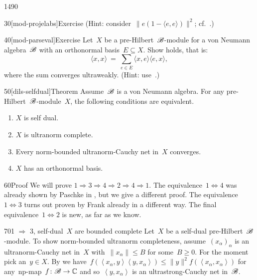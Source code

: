 \begin{parsec}{1490}
\begin{point}{30}[mod-projelabs]{Exercise}
    (Hint: consider~$\| e(1-\langle e, e \rangle) \|^2$;
                 cf.~\cite[thm.~3.12]{paschke}.)
\end{point}
\begin{point}{40}[mod-parseval]{Exercise}
Let~$X$ be a pre-Hilbert~$\mathscr{B}$-module for a von Neumann algebra~$\mathscr{B}$
    with an orthonormal basis~$E \subseteq X$.
    Show  holds, that is:
\begin{equation*}
    \langle x, x \rangle \ =\ 
    \sum_{e \in E} \langle x, e\rangle \langle e, x\rangle,
\end{equation*}
where the sum converges ultraweakly. \cite{paschke}
(Hint: use~.)
\end{point}
\begin{point}{50}[dils-selfdual]{Theorem}%
    Assume~$\mathscr{B}$ is a von Neumann algebra.
    For any pre-Hilbert~$\mathscr{B}$-module~$X$,
        the following conditions are equivalent.
        \begin{enumerate}
            \item $X$ is self dual.
            \item $X$ is ultranorm complete.
            \item Every norm-bounded ultranorm-Cauchy net in~$X$ converges.
            \item $X$ has an orthonormal basis.
        \end{enumerate}
        \spacingfix{}
\begin{point}{60}{Proof}%
We will prove $1 \Rightarrow 3 \Rightarrow 4 \Rightarrow 2 \Rightarrow 4 \Rightarrow 1$.
The equivalence~$1 \Leftrightarrow 4$
    was already shown by Paschke in \cite[thm.~3.12]{paschke},
    but we give a different proof.
The equivalence~$1 \Leftrightarrow 3$ turns out
    proven by Frank already \cite[thm.~3.2]{frank1990self}
    in a different way.
The final equivalence~$1 \Leftrightarrow 2$ is new, as far as we know.
\begin{point}{70}{1 $\Rightarrow$ 3, self-dual~$X$ are bounded complete}%
    Let~$X$ be a self-dual pre-Hilbert~$\mathscr{B}$-module.
    To show norm-bounded ultranorm completeness,
     assume~$(x_\alpha)_\alpha$ is an ultranorm-Cauchy net in~$X$
        with~$\|x_\alpha\| \leq B$ for some~$B \geq 0$.
     For the moment pick an~$y \in X$.
By  we
    have~$f(\left<x_\alpha,y\right>\left<y,x_\alpha\right>) \leq \|y\|^2
        f(\left<x_\alpha,x_\alpha\right>)$ for any~np-map~$f\colon \mathscr{B} \to \mathbb{C}$
        and so~$\left<y,x_\alpha\right>$ is an ultrastrong-Cauchy net in~$\mathscr{B}$.

\end{point}
\end{point}
\end{point}
\end{parsec}
